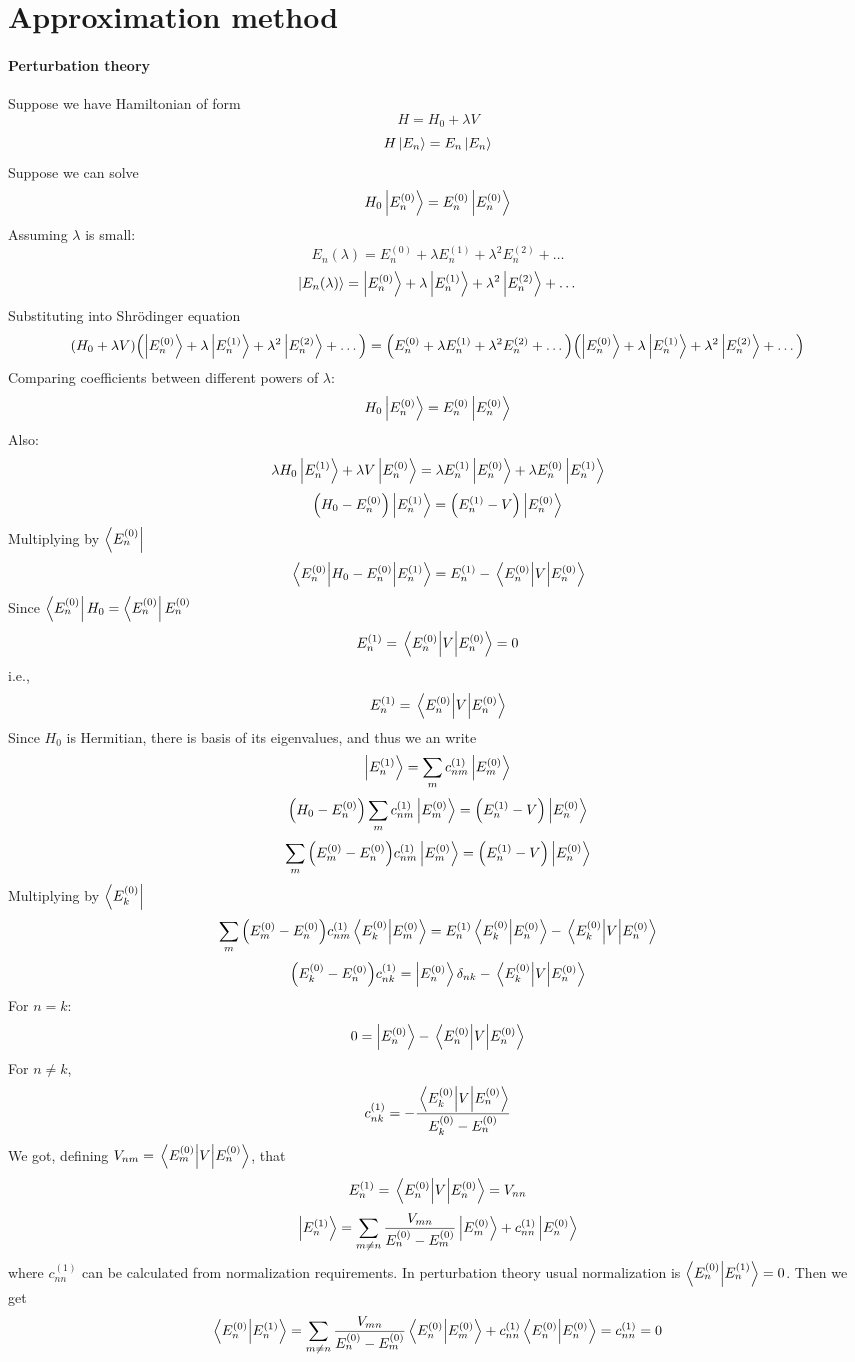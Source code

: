\section{Approximation method}
\paragraph{Perturbation theory}
Suppose we have Hamiltonian of form $$H=H_0+\lambda V$$
$$H\ket{E_n} = E_n\ket{E_n}$$
Suppose we can solve
$$H_0\ket{E_n^{(0)}} = E_n^{(0)} \ket{E_n^{(0)}}$$
Assuming $\lambda$ is small:
$$E_n(\lambda)= E_n^{(0)} + \lambda E_n^{(1)} +\lambda^2 E_n^{(2)} + \dots $$
$$\ket{E_n(\lambda)}= \ket{E_n^{(0)}} + \lambda \ket{E_n^{(1)} }+\lambda^2 \ket{E_n^{(2)}} + \dots $$
Substituting into Shr\"{o}dinger equation 
$$(H_0+\lambda V)\qty( \ket{E_n^{(0)}} + \lambda \ket{E_n^{(1)} }+\lambda^2 \ket{E_n^{(2)}} + \dots) = \qty(E_n^{(0)} + \lambda E_n^{(1)} +\lambda^2 E_n^{(2)} + \dots )\qty( \ket{E_n^{(0)}} + \lambda \ket{E_n^{(1)} }+\lambda^2 \ket{E_n^{(2)}} + \dots)$$
Comparing coefficients between different powers of $\lambda$:
$$H_0\ket{E_n^{(0)}} = E_n^{(0)} \ket{E_n^{(0)}}$$
Also:
$$\lambda H_0\ket{E_n^{(1)}} + \lambda V \ket{E_n^{(0)}}  = \lambda E_n^{(1)} \ket{E_n^{(0)}}+\lambda E_n^{(0)} \ket{E_n^{(1)}}$$
$$\qty(H_0-E_n^{(0)})\ket{E_n^{(1)}}     =  \qty(E_n^{(1)} - V)\ket{E_n^{(0)}}  $$
Multiplying by $\bra{E_n^{(0)}}$
$$\mel{E_n^{(0)}}{H_0-E_n^{(0)}}{E_n^{(1)}}     =  E_n^{(1)} - \mel{E_n^{(0)}}{V}{E_n^{(0)}}  $$
Since $\bra{E_n^{(0)}}H_0 = \bra{E_n^{(0)}}E_n^{(0)}$
$$ E_n^{(1)} = \mel{E_n^{(0)}}{V}{E_n^{(0)}}=0$$
i.e.,
$$ E_n^{(1)} = \mel{E_n^{(0)}}{V}{E_n^{(0)}}$$
Since $H_0$ is Hermitian, there is basis of its eigenvalues, and thus we an write
$$\ket{E_n^{(1)}} = \sum_{m} c_{nm}^{(1)}\ket{E_m^{(0)}} $$
$$\qty(H_0-E_n^{(0)})\sum_{m} c_{nm}^{(1)}\ket{E_m^{(0)}}     =  \qty(E_n^{(1)} - V)\ket{E_n^{(0)}}  $$
$$\sum_{m}\qty(E_m^{(0)}-E_n^{(0)}) c_{nm}^{(1)}\ket{E_m^{(0)}}     =  \qty(E_n^{(1)} - V)\ket{E_n^{(0)}}  $$
Multiplying by $\bra{E_k^{(0)}}$
$$\sum_{m}\qty(E_m^{(0)}-E_n^{(0)}) c_{nm}^{(1)}\braket{E_k^{(0)}}{E_m^{(0)}}     =  E_n^{(1)}\braket{E_k^{(0)}}{E_n^{(0)}} - \mel{E_k^{(0)}}{V}{E_n^{(0)}}  $$
$$\qty(E_k^{(0)}-E_n^{(0)}) c_{nk}^{(1)} = \ket{E_n^{(0)}}\delta_{nk}     - \mel{E_k^{(0)}}{V}{E_n^{(0)}}  $$
For $n=k$:
$$0 = \ket{E_n^{(0)}}    - \mel{E_n^{(0)}}{V}{E_n^{(0)}}  $$
For $n\neq k$,
$$c_{nk}^{(1)} = -\frac{\mel{E_k^{(0)}}{V}{E_n^{(0)}}}{E_k^{(0)}-E_n^{(0)}}$$
We got, defining $V_{nm} = \mel{E_m^{(0)}}{V}{E_n^{(0)}}$, that
$$ E_n^{(1)} = \mel{E_n^{(0)}}{V}{E_n^{(0)}} = V_{nn}$$
$$\ket{E_n^{(1)}} = \sum_{m\neq n} \frac{V_{mn}}{E_n^{(0)}-E_m^{(0)}}\ket{E_m^{(0)}} + c_{nn}^{(1)}\ket{E_n^{(0)}} $$
where $c_{nn}^{(1)}$ can be calculated from normalization requirements. In perturbation theory usual normalization is
$\braket{E_n^{(0)}}{E_n^{(1)}} = 0$. Then we get
$$\braket{E_n^{(0)}}{E_n^{(1)}} = \sum_{m\neq n} \frac{V_{mn}}{E_n^{(0)}-E_m^{(0)}}\braket{E_n^{(0)}}{E_m^{(0)}} + c_{nn}^{(1)}\braket{E_n^{(0)}}{E_n^{(0)}} = c_{nn}^{(1)} = 0$$
